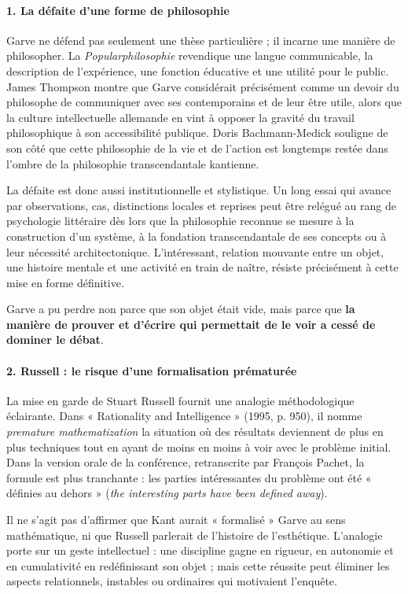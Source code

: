 \documentclass[10pt,a4paper]{article}
\begin{document}
\paragraph{1. La défaite d'une forme de philosophie}
Garve ne défend pas seulement une thèse particulière ; il incarne une manière de philosopher. La \emph{Popularphilosophie} revendique une langue communicable, la description de l'expérience, une fonction éducative et une utilité pour le public. James Thompson montre que Garve considérait précisément comme un devoir du philosophe de communiquer avec ses contemporains et de leur être utile, alors que la culture intellectuelle allemande en vint à opposer la gravité du travail philosophique à son accessibilité publique. Doris Bachmann-Medick souligne de son côté que cette philosophie de la vie et de l'action est longtemps restée dans l'ombre de la philosophie transcendantale kantienne.

La défaite est donc aussi institutionnelle et stylistique. Un long essai qui avance par observations, cas, distinctions locales et reprises peut être relégué au rang de psychologie littéraire dès lors que la philosophie reconnue se mesure à la construction d'un système, à la fondation transcendantale de ses concepts ou à leur nécessité architectonique. L'intéressant, relation mouvante entre un objet, une histoire mentale et une activité en train de naître, résiste précisément à cette mise en forme définitive.

Garve a pu perdre non parce que son objet était vide, mais parce que \textbf{la manière de prouver et d'écrire qui permettait de le voir a cessé de dominer le débat}.

\paragraph{2. Russell : le risque d'une formalisation prématurée}
La mise en garde de Stuart Russell fournit une analogie méthodologique éclairante. Dans « Rationality and Intelligence » (1995, p. 950), il nomme \emph{premature mathematization} la situation où des résultats deviennent de plus en plus techniques tout en ayant de moins en moins à voir avec le problème initial. Dans la version orale de la conférence, retranscrite par François Pachet, la formule est plus tranchante : les parties intéressantes du problème ont été « définies au dehors » (\emph{the interesting parts have been defined away}).

Il ne s'agit pas d'affirmer que Kant aurait « formalisé » Garve au sens mathématique, ni que Russell parlerait de l'histoire de l'esthétique. L'analogie porte sur un geste intellectuel : une discipline gagne en rigueur, en autonomie et en cumulativité en redéfinissant son objet ; mais cette réussite peut éliminer les aspects relationnels, instables ou ordinaires qui motivaient l'enquête.
\end{document}
